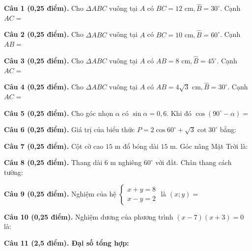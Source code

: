 \documentclass[12pt,a4paper]{article}
\begin{document}
\vspace{1.2mm}
\noindent\textbf{Câu 1 (0,25 điểm).} Cho $\Delta ABC$ vuông tại $A$ có $BC = 12\text{ cm}, \widehat{B} = 30^\circ$. Cạnh $AC =$ \par\vspace{0.6mm}
\noindent\textbf{Câu 2 (0,25 điểm).} Cho $\Delta ABC$ vuông tại $A$ có $BC = 10\text{ cm}, \widehat{B} = 60^\circ$. Cạnh $AB =$ \par\vspace{0.6mm}
\noindent\textbf{Câu 3 (0,25 điểm).} Cho $\Delta ABC$ vuông tại $A$ có $AB = 8\text{ cm}, \widehat{B} = 45^\circ$. Cạnh $AC =$ \par\vspace{0.6mm}
\noindent\textbf{Câu 4 (0,25 điểm).} Cho $\Delta ABC$ vuông tại $A$ có $AB = 4\sqrt{3}\text{ cm}, \widehat{B} = 30^\circ$. Cạnh $AC =$ \par\vspace{0.6mm}
\noindent\textbf{Câu 5 (0,25 điểm).} Cho góc nhọn $\alpha$ có $\sin \alpha = 0{,}6$. Khi đó $\cos(90^\circ - \alpha) =$ \par\vspace{0.6mm}
\noindent\textbf{Câu 6 (0,25 điểm).} Giá trị của biểu thức $P = 2\cos 60^\circ + \sqrt{3}\cot 30^\circ$ bằng: \par\vspace{0.6mm}
\noindent\textbf{Câu 7 (0,25 điểm).} Cột cờ cao $15\text{ m}$ đổ bóng dài $15\text{ m}$. Góc nâng Mặt Trời là: \par\vspace{0.6mm}
\noindent\textbf{Câu 8 (0,25 điểm).} Thang dài $6\text{ m}$ nghiêng $60^\circ$ với đất. Chân thang cách tường: \par\vspace{0.6mm}
\noindent\textbf{Câu 9 (0,25 điểm).} Nghiệm của hệ $\begin{cases} x + y = 8 \\ x - y = 2 \end{cases}$ là $(x; y) =$ \par\vspace{0.6mm}
\noindent\textbf{Câu 10 (0,25 điểm).} Nghiệm dương của phương trình $(x - 7)(x + 3) = 0$ là: \par\vspace{0.6mm}
\vspace{0.8mm}
\noindent\textbf{Câu 11 (2,5 điểm). Đại số tổng hợp:}
\vspace{0.6mm}
\end{document}
